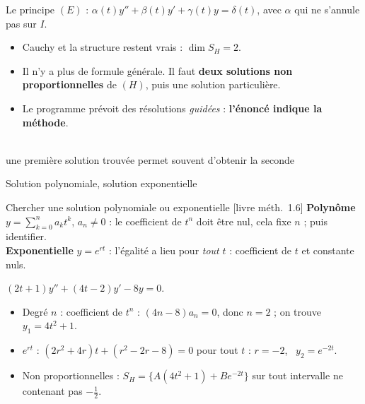 \documentclass[aspectratio=169,10pt]{beamer}
\DeclareRobustCommand{\livre}[1]{{\sffamily\scriptsize\color{Gris}[livre #1]}}
\begin{document}
\begin{frame}{Le principe}
$(E)$ : $\alpha(t)y''+\beta(t)y'+\gamma(t)y=\delta(t)$, avec $\alpha$ \alert{qui ne s'annule pas} sur $I$.
\begin{itemize}
\item Cauchy et la structure restent vrais : $\dim S_H=2$.
\item Il n'y a \alert{plus de formule générale}. Il faut \textbf{deux solutions non proportionnelles} de $(H)$, puis une solution particulière.
\item Le programme prévoit des résolutions \emph{guidées} : \textbf{l'énoncé indique la méthode}.
\end{itemize}
\pause
\begin{center}
\\[2pt]
{\footnotesize\color{Gris}une première solution trouvée permet souvent d'obtenir la seconde}
\end{center}
\end{frame}

\begin{frame}{Solution polynomiale, solution exponentielle}
\begin{METH}{Chercher une solution polynomiale ou exponentielle \livre{méth.~1.6}}
\textbf{Polynôme} $y=\sum_{k=0}^na_kt^k$, $a_n\neq0$ : le coefficient de $t^n$ doit être nul, cela fixe $n$ ; puis identifier.\\
\textbf{Exponentielle} $y=e^{rt}$ : l'égalité a lieu pour \emph{tout} $t$ : coefficient de $t$ et constante nuls.
\end{METH}
\pause
\begin{EX}
$(2t+1)y''+(4t-2)y'-8y=0$.
\begin{itemize}
\item Degré $n$ : coefficient de $t^n$ : $(4n-8)a_n=0$, donc $n=2$ ; on trouve $y_1=4t^2+1$.
\item $e^{rt}$ : $(2r^2+4r)t+(r^2-2r-8)=0$ pour tout $t$ : $r=-2$, \ $y_2=e^{-2t}$.
\item Non proportionnelles : $S_H=\{A(4t^2+1)+Be^{-2t}\}$ sur tout intervalle ne contenant pas $-\frac12$.
\end{itemize}
\end{EX}
\end{frame}
\end{document}
